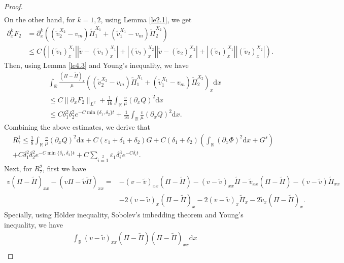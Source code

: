 \documentclass[10pt,reqno]{amsart}
\numberwithin{equation}{section}
\newcommand{\dif}{\mathrm{d}}
\begin{document}
\begin{proof}
\begin{align*}
\end{align*}
On the other hand, for $k=1,2$, using Lemma \ref{le2.1}, we get
\begin{align*}
\partial_x^{k}F_2&=
\partial_x^{k}\left(\left(\widetilde{v}^{X_2}_2-v_m\right)\widetilde{\Pi}_1^{X_1}
+\left(\widetilde{v}^{X_1}_1-v_m\right)\widetilde{\Pi}_2^{X_2}\right)\\
&\le
C\left(|(\widetilde{v}_1)^{X_1}_x||\widetilde{v}-(\widetilde{v}_1)^{X_1}_x|
+|(\widetilde{v}_2)^{X_2}_x||\widetilde{v}-(\widetilde{v}_2)^{X_2}_x|
+|(\widetilde{v}_1)^{X_1}_x||(\widetilde{v}_2)^{X_2}_x|\right).
\end{align*}
Then, using Lemma \ref{le4.3} and Young's inequality, we have
\begin{align*}
 &\int_\mathbb{R}\frac{(\Pi-\widetilde{\Pi})_{x}}{\mu}
 \left(\left(\widetilde{v}^{X_2}_2-v_m\right)\widetilde{\Pi}_1^{X_1}
+\left(\widetilde{v}^{X_1}_1-v_m\right)\widetilde{\Pi}_2^{X_2}\right)_x\dif x\\
&\le C\|\partial_x F_2\|_{L^2} +\frac{1}{16}\int_\mathbb{R}\frac{v}{\mu}(\partial_xQ)^2\dif x\\
&\le C\delta_1^2\delta_2^2e^{-C\min\{\delta_1,\delta_2\}t}
+\frac{1}{16}\int_\mathbb{R}\frac{v}{\mu}(\partial_xQ)^2\dif x.
\end{align*}
Combining the above estimates, we derive that
\begin{align*}
 &R_7^1 \le \frac{1}{8}\int_\mathbb{R}\frac{v}{\mu}(\partial_xQ)^2\dif x
 +C(\varepsilon_1+\delta_1+\delta_2)G
 +C(\delta_1+\delta_2)\left(\int_\mathbb{R}(\partial_x\Phi)^2\dif x+G^s\right)\\
 &+C\delta_1^2\delta_2^2e^{-C\min\{\delta_1,\delta_2\}t}
 +C\sum\limits_{i=1}\limits^2\varepsilon_1 \delta_i^3e^{-C\delta_i t}.
\end{align*}
Next, for $R_7^2$, first we have
\begin{align*}
v(\Pi-\widetilde{\Pi})_{xx}-(v\Pi-\widetilde{v}\widetilde{\Pi})_{xx}=
&-(v-\widetilde{v})_{xx}(\Pi-\widetilde{\Pi})
-(v-\widetilde{v})_{xx}\widetilde{\Pi}-\widetilde{v}_{xx}(\Pi-\widetilde{\Pi})
-(v-\widetilde{v})\widetilde{\Pi}_{xx}\\
&-2(v-\widetilde{v})_{x}(\Pi-\widetilde{\Pi})_{x}-2(v-\widetilde{v})_{x}\widetilde{\Pi}_{x}
-2\widetilde{v}_{x}(\Pi-\widetilde{\Pi})_{x}.
\end{align*}
Specially, using H\"{o}lder inequality, Sobolev's imbedding theorem and Young's inequality, we have
\begin{align*}
&\int_\mathbb{R}(v-\widetilde{v})_{xx}(\Pi-\widetilde{\Pi})(\Pi-\widetilde{\Pi})_{xx}\dif x\\

\end{align*}
\end{proof}
\end{document}
